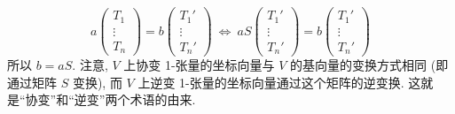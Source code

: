 \begin{enumerate}[label=(\arabic*),leftmargin=*]
\[
  a\begin{pmatrix}T_1\\\vdots\\T_n\end{pmatrix}
  =b\begin{pmatrix}T_1'\\\vdots\\T_n'\end{pmatrix}
  \ \Leftrightarrow\
  aS\begin{pmatrix}T_1'\\\vdots\\T_n'\end{pmatrix}
  =b\begin{pmatrix}T_1'\\\vdots\\T_n'\end{pmatrix}
\]
所以 $b=aS$. 注意, $V$ 上协变 1-张量的坐标向量与 $V$ 的基向量的变换方式相同 (即通过矩阵 $S$ 变换), 而 $V$ 上逆变 1-张量的坐标向量通过这个矩阵的逆变换. 这就是\textquotedblleft 协变\textquotedblright 和\textquotedblleft 逆变\textquotedblright 两个术语的由来.
\end{enumerate}


